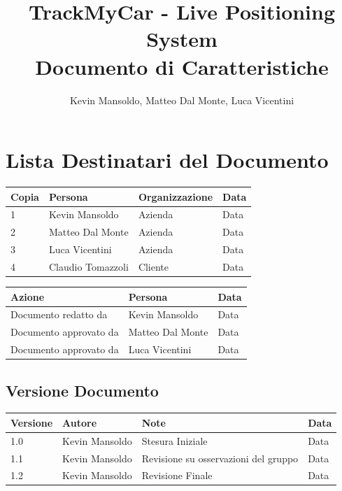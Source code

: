 \documentclass[a4paper,12pt]{article}
\begin{document}
\title{\textbf{TrackMyCar - Live Positioning System}\\Documento di Caratteristiche}

\author{Kevin Mansoldo, Matteo Dal Monte, Luca Vicentini}
\date{}
\maketitle
\pagebreak

\tableofcontents
\pagebreak

\section{Lista Destinatari del Documento}

\begin{table}[ht]
\begin{center}
\begin{tabular}{p{1cm} p{4.5cm} p{5cm} p{2cm}}
\rowcolor{Ash}
\hline
Copia & Persona & Organizzazione & Data \\ \hline
1 & Kevin Mansoldo & Azienda & Data \\ 
2 & Matteo Dal Monte & Azienda & Data \\ 
3 & Luca Vicentini & Azienda & Data \\ 
4 & Claudio Tomazzoli & Cliente & Data \\ \hline
\end{tabular}
\end{center}


\begin{center}
\begin{tabular}{p{6cm} p{5cm} p{2cm}}
\rowcolor{Ash}
\hline
Azione & Persona & Data \\ \hline
Documento redatto da & Kevin Mansoldo & Data \\ 
Documento approvato da & Matteo Dal Monte & Data \\ 
Documento approvato da & Luca Vicentini & Data \\ \hline
\end{tabular}
\end{center}
\end{table}

\subsection{Versione Documento}
\begin{table}[ht]
\begin{center}
\begin{tabular}{p{1cm} p{4.5cm} p{5cm} p{2cm}}
\rowcolor{Ash}
\hline
Versione & Autore & Note & Data \\ \hline
1.0 & Kevin Mansoldo & Stesura Iniziale & Data \\ 
1.1 & Kevin Mansoldo & Revisione su osservazioni del gruppo & Data \\ 
1.2 & Kevin Mansoldo & Revisione Finale & Data \\ \hline
\end{tabular}
\end{center}
\end{table}
\end{document}
